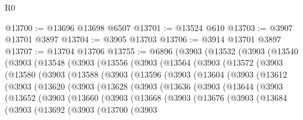 \begin{lexlean}{R0}
\begin{coremodule}
@13700 := @13696 @13698 @6507
@13701 := @13524 @610
@13703 := @3907 @13701 @3897
@13704 := @3905 @13703
@13706 := @3914 @13701 @3897
@13707 := @13704 @13706
@13755 := @6896
    (@3903
      (@13532
        (@3903
          (@13540
            (@3903
              (@13548
                (@3903
                  (@13556
                    (@3903
                      (@13564
                        (@3903
                          (@13572
                            (@3903
                              (@13580
                                (@3903
                                  (@13588
                                    (@3903
                                      (@13596
                                        (@3903
                                          (@13604
                                            (@3903
                                              (@13612
                                                (@3903
                                                  (@13620
                                                    (@3903
                                                      (@13628
                                                        (@3903
                                                          (@13636
                                                            (@3903
                                                              (@13644
                                                                (@3903
                                                                  (@13652
                                                                    (@3903
                                                                      (@13660
                                                                        (@3903
                                                                          (@13668
                                                                            (@3903
                                                                              (@13676
                                                                                (@3903
                                                                                  (@13684
                                                                                    (@3903
                                                                                      (@13692
                                                                                        (@3903
                                                                                          (@13700
                                                                                            (@3903

\end{coremodule}
\end{lexlean}
